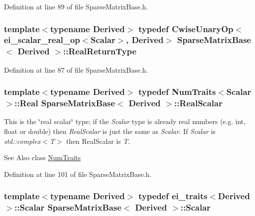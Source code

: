 Definition at line 89 of file Sparse\-Matrix\-Base.\-h.

\hypertarget{class_sparse_matrix_base_a4083b1cd2d21766ea0456f57a84d0da9}{
\subsubsection[{Real\-Return\-Type}]{\setlength{\rightskip}{0pt plus 5cm}template$<$typename Derived$>$ typedef {\bf Cwise\-Unary\-Op}$<${\bf ei\-\_\-scalar\-\_\-real\-\_\-op}$<${\bf Scalar}$>$, Derived$>$ {\bf Sparse\-Matrix\-Base}$<$ Derived $>$\-::{\bf Real\-Return\-Type}}}\label{class_sparse_matrix_base_a4083b1cd2d21766ea0456f57a84d0da9}


Definition at line 87 of file Sparse\-Matrix\-Base.\-h.

\hypertarget{class_sparse_matrix_base_a615d56082efd03b5f31015cc4900e72f}{
\subsubsection[{Real\-Scalar}]{\setlength{\rightskip}{0pt plus 5cm}template$<$typename Derived$>$ typedef {\bf Num\-Traits}$<${\bf Scalar}$>$\-::Real {\bf Sparse\-Matrix\-Base}$<$ Derived $>$\-::{\bf Real\-Scalar}}}\label{class_sparse_matrix_base_a615d56082efd03b5f31015cc4900e72f}
This is the \char`\"{}real scalar\char`\"{} type; if the {\itshape Scalar} type is already real numbers (e.\-g. int, float or double) then {\itshape Real\-Scalar} is just the same as {\itshape Scalar}. If {\itshape Scalar} is {\itshape std\-::complex$<$\-T$>$} then Real\-Scalar is {\itshape T}.

\begin{DoxySeeAlso}{See Also}
class \hyperlink{struct_num_traits}{Num\-Traits} 
\end{DoxySeeAlso}


Definition at line 101 of file Sparse\-Matrix\-Base.\-h.

\hypertarget{class_sparse_matrix_base_af39d70f2b7e775e9e17b666cd24128c8}{
\subsubsection[{Scalar}]{\setlength{\rightskip}{0pt plus 5cm}template$<$typename Derived$>$ typedef {\bf ei\-\_\-traits}$<$Derived$>$\-::{\bf Scalar} {\bf Sparse\-Matrix\-Base}$<$ Derived $>$\-::{\bf Scalar}}}\label{class_sparse_matrix_base_af39d70f2b7e775e9e17b666cd24128c8}


